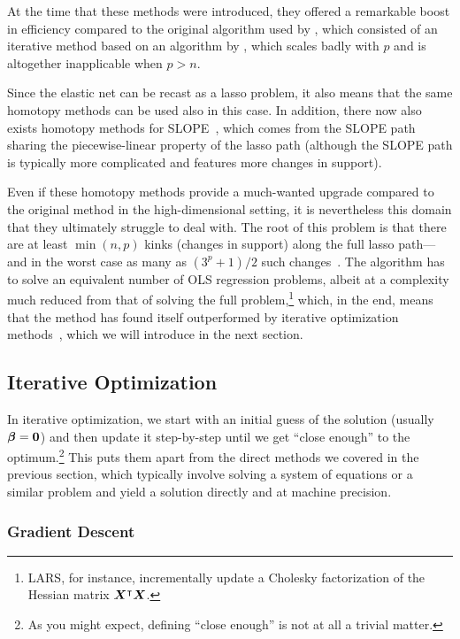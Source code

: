 At the time that these methods were introduced, they offered a remarkable boost in efficiency compared to the original algorithm used by \textcite{tibshirani1996}, which consisted of an iterative method based on an algorithm by \textcite{lawson1995}, which scales badly with \(p\) and is altogether inapplicable when \(p > n\).

Since the elastic net can be recast as a lasso problem, it also means that the same homotopy methods can be used also in this case. In addition, there now also exists homotopy methods for SLOPE~\parencite{nomura2020,dupuis2023}, which comes from the SLOPE path sharing the piecewise-linear property of the lasso path (although the SLOPE path is typically more complicated and features more changes in support).

Even if these homotopy methods provide a much-wanted upgrade compared to the original method in the high-dimensional setting, it is nevertheless this domain that they ultimately struggle to deal with. The root of this problem is that there are at least \(\min(n,p)\) kinks (changes in support) along the full lasso path---and in the worst case as many as \((3^p + 1)/2\) such changes~\parencite{mairal2012}. The algorithm has to solve an equivalent number of OLS regression problems, albeit at a complexity much reduced from that of solving the full problem,\footnote{LARS, for instance, incrementally update a Cholesky factorization of the Hessian matrix \(\boldsymbol{X}^\intercal\boldsymbol{X}\).} which, in the end, means that the method has found itself outperformed by iterative optimization methods~\parencite{friedman2010}, which we will introduce in the next section.

\subsection{Iterative Optimization}\label{sec:iterative-optimization}

In iterative optimization, we start with an initial guess of the solution (usually \(\boldsymbol{\beta} = \boldsymbol{0}\)) and then update it step-by-step until we get ``close enough'' to the optimum.\footnote{As you might expect, defining ``close enough'' is not at all a trivial matter.} This puts them apart from the direct methods we covered in the previous section, which typically involve solving a system of equations or a similar problem and yield a solution directly and at machine precision.

\subsubsection{Gradient Descent}

